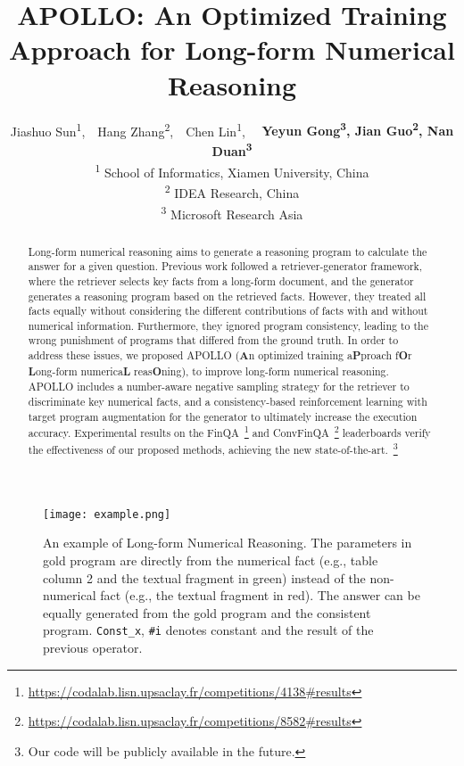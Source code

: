 \documentclass[11pt]{article}
\title{APOLLO: An Optimized Training Approach for Long-form Numerical Reasoning}
\author{
Jiashuo Sun\textsuperscript{\rm 1},\ \ 
Hang Zhang\textsuperscript{\rm 2},\ \
Chen Lin\textsuperscript{\rm 1}\footnotemark[1],\ \ 
\textbf{
Yeyun Gong\textsuperscript{\rm 3},
Jian Guo\textsuperscript{\rm 2},
Nan Duan\textsuperscript{\rm 3}}
\\
\textsuperscript{\rm 1} 
School of Informatics, Xiamen University, China\\
\textsuperscript{\rm 2}
IDEA Research, China\\
\textsuperscript{\rm 3}
Microsoft Research Asia
}
\begin{document}
\maketitle
\renewcommand{\thefootnote}{\fnsymbol{footnote}}


\begin{abstract}
Long-form numerical reasoning aims to generate a reasoning program to calculate the answer for a given question. Previous work followed a retriever-generator framework, where the retriever selects key facts from a long-form document, and the generator generates a reasoning program based on the retrieved facts. However, they treated all facts equally without considering the different contributions of facts with and without numerical information. Furthermore, they ignored program consistency, leading to the wrong punishment of programs that differed from the ground truth. In order to address these issues, we proposed APOLLO (\textbf{A}n optimized training a\textbf{P}proach f\textbf{O}r \textbf{L}ong-form numerica\textbf{L} reas\textbf{O}ning), to improve long-form numerical reasoning. APOLLO includes a number-aware negative sampling strategy for the retriever to discriminate key numerical facts, and a consistency-based reinforcement learning with target program augmentation for the generator to ultimately increase the execution accuracy. 
Experimental results on the FinQA~\footnote{\url{https://codalab.lisn.upsaclay.fr/competitions/4138\#results}} and ConvFinQA~\footnote{\url{https://codalab.lisn.upsaclay.fr/competitions/8582\#results}} leaderboards verify the effectiveness of our proposed methods, achieving the new state-of-the-art.~\footnote{Our code will be publicly available in the future.}

\end{abstract}

\begin{figure}[t]
    \centerline{\texttt{[image: example.png]}}
    \caption{An example of Long-form Numerical Reasoning. The parameters in gold program are directly from the numerical fact (e.g., \textcolor[RGB]{112,173,71}{table column 2 and the textual fragment in green}) instead of the non-numerical fact (e.g.,  \textcolor[RGB]{255,0,0}{the textual fragment in red}). The answer can be equally generated from the gold program and the \textcolor[RGB]{91,155,213}{consistent program}. \texttt{Const\_x}, \texttt{\#i} denotes constant  and the result of the previous  operator.}
    \label{figure:example}
\end{figure}
\end{document}
